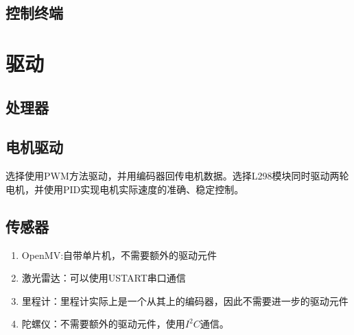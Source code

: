 \documentclass{report}
\begin{document}
\subsection{控制终端}
\label{subsec:label}
\section{驱动}
\label{sec:label}
\subsection{处理器}
\label{subsec:label}
\subsection{电机驱动}
\label{subsec:label}
选择使用PWM方法驱动，并用编码器回传电机数据。选择L298模块同时驱动两轮电机，并使用PID实现电机实际速度的准确、稳定控制。
\subsection{传感器}
\label{subsec:label}
\begin{enumerate}
\item OpenMV:自带单片机，不需要额外的驱动元件
\item 激光雷达：可以使用USTART串口通信
\item 里程计：里程计实际上是一个从其上的编码器，因此不需要进一步的驱动元件
  \item 陀螺仪：不需要额外的驱动元件，使用$I^{2}C$通信。

  \end{enumerate}
  \newpage
\end{document}
